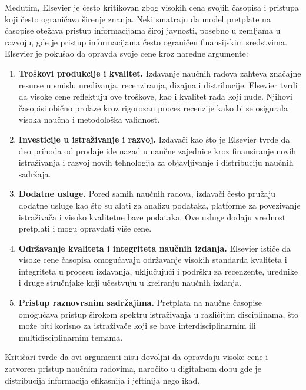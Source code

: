 \documentclass{article}
\begin{document}
Međutim, Elsevier je često kritikovan zbog visokih cena svojih časopisa i pristupa koji često ograničava širenje znanja. Neki smatraju da model pretplate na časopise otežava pristup informacijama široj javnosti, posebno u zemljama u razvoju, gde je pristup informacijama često ograničen finansijskim sredstvima. Elsevier je pokušao da opravda svoje cene kroz naredne argumente\cite{baldwin2023athena}:

\begin{enumerate}
    \item \textbf{Troškovi produkcije i kvalitet.} Izdavanje naučnih radova zahteva značajne resurse u smislu uređivanja, recenziranja, dizajna i distribucije. Elsevier tvrdi da visoke cene reflektuju ove troškove, kao i kvalitet rada koji nude. Njihovi časopisi obično prolaze kroz rigorozan proces recenzije kako bi se osigurala visoka naučna i metodološka validnost.
    \item \textbf{Investicije u istraživanje i razvoj.} Izdavači kao što je Elsevier tvrde da deo prihoda od prodaje ide nazad u naučne zajednice kroz finansiranje novih istraživanja i razvoj novih tehnologija za objavljivanje i distribuciju naučnih sadržaja.
    \item \textbf{Dodatne usluge.} Pored samih naučnih radova, izdavači često pružaju dodatne usluge kao što su alati za analizu podataka, platforme za povezivanje istraživača i visoko kvalitetne baze podataka. Ove usluge dodaju vrednost pretplati i mogu opravdati više cene.
    \item \textbf{Održavanje kvaliteta i integriteta naučnih izdanja.} Elsevier ističe da visoke cene časopisa omogućavaju održavanje visokih standarda kvaliteta i integriteta u procesu izdavanja, uključujući i podršku za recenzente, urednike i druge stručnjake koji učestvuju u kreiranju naučnih izdanja.
    \item \textbf{Pristup raznovrsnim sadržajima.} Pretplata na naučne časopise omogućava pristup širokom spektru istraživanja u različitim disciplinama, što može biti korisno za istraživače koji se bave interdisciplinarnim ili multidisciplinarnim temama.
\end{enumerate}

Kritičari tvrde da ovi argumenti nisu dovoljni da opravdaju visoke cene i zatvoren pristup naučnim radovima, naročito u digitalnom dobu gde je distribucija informacija efikasnija i jeftinija nego ikad.

\end{document}
